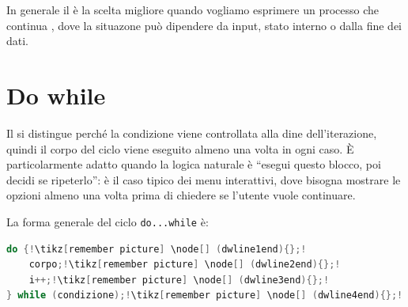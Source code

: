 \vspace{2.5cm}

In generale il  è la scelta migliore quando vogliamo esprimere un processo che continua , dove la situazone può dipendere da input, stato interno o dalla fine dei dati. 






\section{Do while }
Il  si distingue perché la condizione viene controllata alla dine dell'iterazione, quindi il corpo del ciclo viene eseguito almeno una volta in ogni caso. 
È particolarmente adatto quando la logica naturale è “esegui questo blocco, poi decidi se ripeterlo”: è il caso tipico dei menu interattivi, dove bisogna mostrare le opzioni almeno una volta prima di chiedere se l'utente vuole continuare.

La forma generale del ciclo \texttt{do...while} è:

\vspace{2.3cm}
\begin{center}
\begin{minipage}{15.5cm}
\begin{lstlisting}[style=stile_disegno, language = C++,
    escapechar = !,
    basicstyle = \ttfamily\bfseries\large,
    linewidth = .705\linewidth]
do {!\tikz[remember picture] \node[] (dwline1end){};!
    corpo;!\tikz[remember picture] \node[] (dwline2end){};!
    i++;!\tikz[remember picture] \node[] (dwline3end){};!
} while (condizione);!\tikz[remember picture] \node[] (dwline4end){};!
\end{lstlisting}
\end{minipage}
\end{center}

